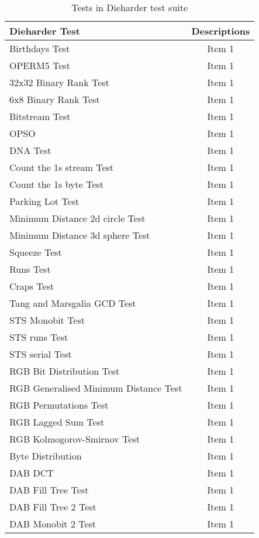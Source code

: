 \begin{table}[!h]
	\begin{center}
		\begin{tabular}{|l|c|} 
		\hline
		 \bf  Dieharder Test & \bf Descriptions  \\
		  \hline
		Birthdays Test & Item 1 \\
		OPERM5 Test & Item 1 \\
		32x32 Binary Rank Test & Item 1 \\
		6x8 Binary Rank Test & Item 1 \\
		Bitstream Test & Item 1 \\
		OPSO & Item 1 \\
		DNA Test & Item 1 \\
		Count the 1s stream Test & Item 1 \\
		Count the 1s byte Test & Item 1 \\
		Parking Lot Test & Item 1 \\
		Minimum Distance 2d circle Test & Item 1 \\
		Minimum Distance 3d sphere Test & Item 1 \\
		Squeeze Test & Item 1 \\
		Runs Test & Item 1 \\
		Craps Test & Item 1 \\
		Tang and Marsgalia GCD Test & Item 1 \\
		STS Monobit Test & Item 1 \\
		STS runs Test & Item 1 \\
		STS serial Test & Item 1 \\
		RGB Bit Distribution Test & Item 1 \\
		RGB Generalised Minimum Distance Test & Item 1 \\
		RGB Permutations Test & Item 1 \\
		RGB Lagged Sum Test & Item 1 \\
		RGB Kolmogorov-Smirnov Test & Item 1 \\
		Byte Distribution & Item 1 \\
		DAB DCT & Item 1 \\
		DAB Fill Tree Test & Item 1 \\
		DAB Fill Tree 2 Test & Item 1 \\
		DAB Monobit 2 Test & Item 1 \\
		\hline
		\end{tabular}
	\end{center}
	\caption[Comparison of Closely-Related Projects]{Tests in Dieharder test suite}	
	\label{tab:SummaryProjects}
	\end{table}

